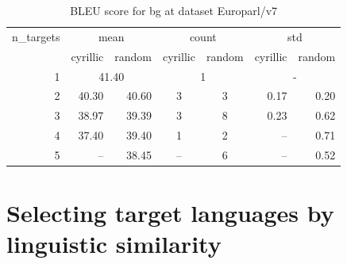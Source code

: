 \begin{table}[]
\begin{tabular}{r|rr|cc|rr}
\toprule
n\_targets & \multicolumn{2}{c}{mean} & \multicolumn{2}{c}{count} &\multicolumn{2}{c}{std} \\
          &   cyrillic &  random & cyrillic & random &  cyrillic &    random \\
\midrule
        1 & \multicolumn{2}{c|}{41.40} & \multicolumn{2}{c|}{1} & \multicolumn{2}{c}{-}  \\
\midrule
        2 &         40.30 &      40.60 &           3 &        3 &       0.17 &      0.20 \\
        3 &         38.97 &      39.39 &           3 &        8 &       0.23 &      0.62 \\
        4 &         37.40 &      39.40 &           1 &        2 &        --  &      0.71 \\
        5 &           --  &      38.45 &         --  &        6 &        --  &      0.52 \\
\bottomrule
\end{tabular}

\caption{BLEU score for  bg at dataset Europarl/v7 }
\label{ table:bg/Europarl/v7 }
\end{table}
\section{Selecting target languages by linguistic similarity}

